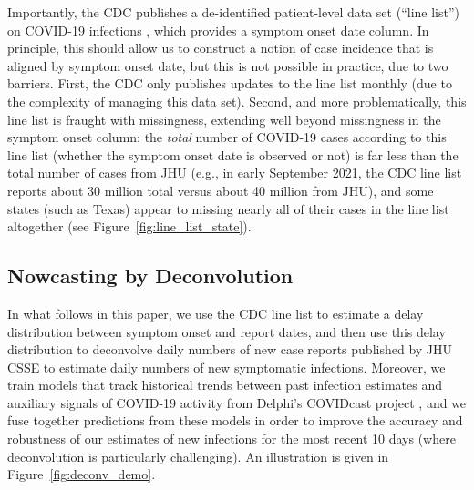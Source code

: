 \documentclass[sts]{imsart}
\theoremstyle{plain}
\theoremstyle{definition}
\theoremstyle{remark}
\begin{document}
Importantly, the CDC publishes a de-identified patient-level data set (``line
list'') on COVID-19 infections \citep{cdc_public}, which provides a symptom 
onset date column. In principle, this should allow us to construct a notion of
case incidence that is aligned by symptom onset date, but this is not possible
in practice, due to two barriers. First, the CDC only publishes updates to the 
line list monthly (due to the complexity of managing this data set). Second, 
and more problematically, this line list is fraught with missingness,
extending well beyond missingness in the symptom onset column: the \emph{total}
number of COVID-19 cases according to this line list (whether the symptom onset
date is observed or not) is far less than the total number of cases from JHU
(e.g., in early September 2021, the CDC line list reports about 30 million total
versus about 40 million from JHU), and some states (such as Texas) appear to 
missing nearly all of their cases in the line list altogether (see
Figure~\ref{fig:line_list_state}). 

\subsection{Nowcasting by Deconvolution}

In what follows in this paper, we use the CDC line list to estimate a delay
distribution between symptom onset and report dates, and then use this delay
distribution to deconvolve daily numbers of new case reports published by JHU
CSSE to estimate daily numbers of new symptomatic infections. Moreover, we train
models that track historical trends between past infection estimates and
auxiliary signals of COVID-19 activity from Delphi's COVIDcast project
\citep{Reinhart:2021}, and we fuse together predictions from these models in
order to improve the accuracy and robustness of our estimates of new infections
for the most recent 10 days (where deconvolution is particularly
challenging). An illustration is given in Figure~\ref{fig:deconv_demo}.
\end{document}
